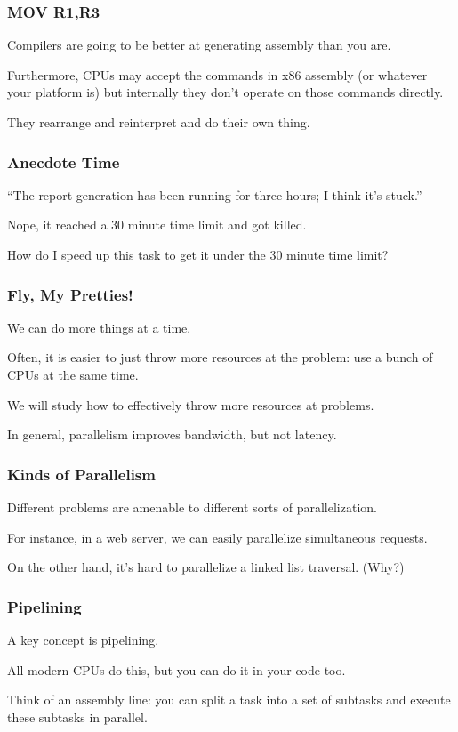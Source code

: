\begin{frame}
\frametitle{MOV R1,R3}

Compilers are going to be better at generating assembly than you are. 

Furthermore, CPUs may accept the commands in x86 assembly (or whatever your platform is) but internally they don't operate on those commands directly. 

They rearrange and reinterpret and do their own thing. 


\end{frame}



\begin{frame}
\frametitle{Anecdote Time}

``The report generation has been running for three hours; I think it's stuck.''

Nope, it reached a 30 minute time limit and got killed. 

How do I speed up this task to get it under the 30 minute time limit?

\end{frame}



\begin{frame}
\frametitle{Fly, My Pretties!}

We can do more things at a time.

Often, it is easier to just throw more
resources at the problem: use a bunch of CPUs at the same time.

 We
will study how to effectively throw more resources at problems.

In general, parallelism improves bandwidth, but not latency.


\end{frame}



\begin{frame}
\frametitle{Kinds of Parallelism}

Different problems are amenable to different sorts of parallelization. 

For instance, in a web server, we
can easily parallelize simultaneous requests. 

On the other hand, it's hard
to parallelize a linked list traversal. (Why?)



\end{frame}



\begin{frame}
\frametitle{Pipelining}

A key concept is pipelining. 

All modern CPUs do this,
but you can do it in your code too. 

Think of an assembly line: you can split
a task into a set of subtasks and execute these subtasks in parallel.


\end{frame}




